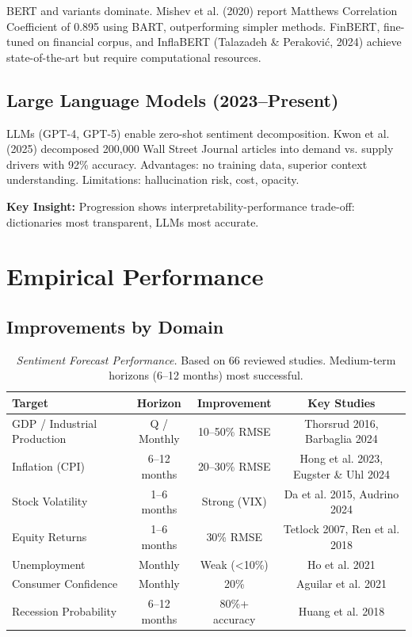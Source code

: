 \documentclass[11pt]{article}
\begin{document}
BERT and variants dominate. Mishev et al. (2020) report Matthews Correlation Coefficient of 0.895 using BART, outperforming simpler methods. FinBERT, fine-tuned on financial corpus, and InflaBERT (Talazadeh \& Peraković, 2024) achieve state-of-the-art but require computational resources.

\subsection{Large Language Models (2023--Present)}

LLMs (GPT-4, GPT-5) enable zero-shot sentiment decomposition. Kwon et al. (2025) decomposed 200,000 Wall Street Journal articles into demand vs. supply drivers with 92\% accuracy. Advantages: no training data, superior context understanding. Limitations: hallucination risk, cost, opacity.

\textbf{Key Insight:} Progression shows interpretability-performance trade-off: dictionaries most transparent, LLMs most accurate.

\section{Empirical Performance}

\subsection{Improvements by Domain}

\begin{table}[H]
\centering \small
\begin{tabular}{lccc}
\toprule
\textbf{Target} & \textbf{Horizon} & \textbf{Improvement} & \textbf{Key Studies} \\
\midrule
GDP / Industrial Production & Q / Monthly & 10--50\% RMSE & Thorsrud 2016, Barbaglia 2024 \\
Inflation (CPI) & 6--12 months & 20--30\% RMSE & Hong et al. 2023, Eugster \& Uhl 2024 \\
Stock Volatility & 1--6 months & Strong (VIX) & Da et al. 2015, Audrino 2024 \\
Equity Returns & 1--6 months & 30\% RMSE & Tetlock 2007, Ren et al. 2018 \\
Unemployment & Monthly & Weak (<10\%) & Ho et al. 2021 \\
Consumer Confidence & Monthly & 20\% & Aguilar et al. 2021 \\
Recession Probability & 6--12 months & 80\%+ accuracy & Huang et al. 2018 \\
\bottomrule
\end{tabular}
\caption{\textit{Sentiment Forecast Performance.} Based on 66 reviewed studies. Medium-term horizons (6--12 months) most successful.}
\label{tab:perf}
\end{table}
\end{document}

